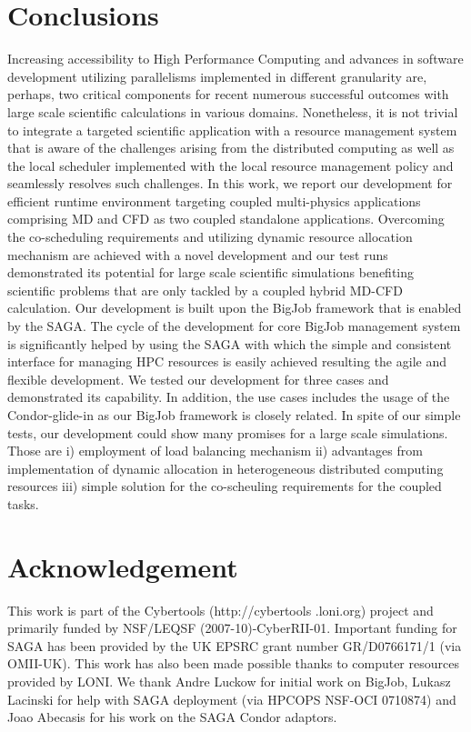 \documentclass[conference,final]{IEEEtran}
\begin{document}
\section{Conclusions}

Increasing accessibility to High Performance Computing and advances in software development utilizing parallelisms implemented in different granularity are, perhaps, two critical components for recent numerous successful outcomes with large scale scientific calculations in various domains. Nonetheless, it is not trivial to integrate a targeted scientific application with a resource management system that is aware of the challenges arising from the distributed computing as well as the local scheduler implemented with the local resource management policy and seamlessly resolves such challenges.  
In this work, we report our development for efficient runtime environment targeting coupled multi-physics applications comprising MD and CFD as two coupled standalone applications.  Overcoming the co-scheduling requirements and utilizing dynamic resource allocation mechanism are achieved with a novel development and our test runs demonstrated its potential for large scale scientific simulations benefiting scientific problems that are only tackled by a coupled hybrid MD-CFD calculation.
Our development is built upon the BigJob framework that is enabled by the SAGA.  The cycle of the development for core BigJob management system is significantly helped by using the SAGA with which the simple and consistent interface for managing HPC resources is easily achieved resulting the agile and flexible development.
We tested our development for three cases and demonstrated its capability.  In addition, the use cases includes the usage of the Condor-glide-in as our BigJob framework is closely related.  In spite of our simple tests, our development could show many promises for a large scale simulations.  Those are i) employment of load balancing mechanism ii) advantages from implementation of dynamic allocation in heterogeneous distributed computing resources iii) simple solution for the co-scheuling requirements for the coupled tasks.



\section*{Acknowledgement}
This work is part of the Cybertools (http://cybertools .loni.org) project and primarily 
funded by NSF/LEQSF (2007-10)-CyberRII-01. Important funding for SAGA has been provided 
by the UK EPSRC grant number GR/D0766171/1 (via OMII-UK). This work has also been made 
possible thanks to computer resources provided by LONI. We thank Andre Luckow for 
initial work on BigJob, Lukasz Lacinski for help with SAGA deployment (via HPCOPS NSF-OCI 
0710874) and Joao Abecasis for his work on the SAGA Condor adaptors.

\nocite{ex1,ex2}
%


\end{document}
